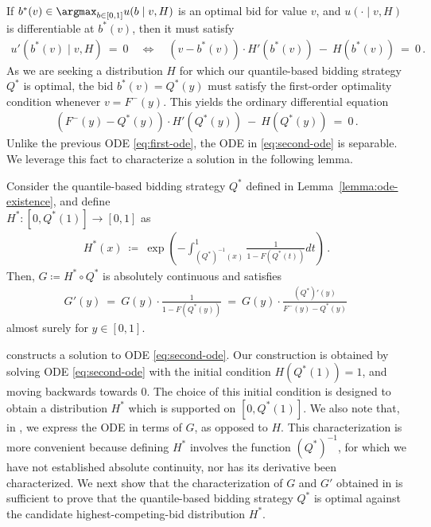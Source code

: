 If $b^*(v) \in \argmax_{b \in [0,1]} u(b \mid v,H)$ is an optimal bid for value $v$, and $u(\cdot \mid v,H)$ is differentiable at $b^*(v)$, then it must satisfy
\begin{align*}
	u'(b^*(v) \mid v,H)\ =\ 0 \quad \iff \quad (v- b^*(v)) \cdot H'(b^*(v))\ -\ H(b^*(v))\ =\ 0\,.
\end{align*}
As we are seeking a distribution $H$ for which our quantile-based bidding strategy $Q^*$ is optimal, the bid $b^*(v) = Q^*(y)$ must satisfy the first-order optimality condition whenever $v = F^-(y)$. This yields the ordinary differential equation
\begin{align}\label{eq:second-ode}
	(F^-(y) - Q^*(y)) \cdot H'(Q^*(y))\ -\ H(Q^*(y))\ =\ 0\,.
\end{align}
Unlike the previous ODE \eqref{eq:first-ode}, the ODE in \eqref{eq:second-ode} is separable. We leverage this fact to characterize a solution in the following lemma. 
\begin{lemma}\label{lemma:second-ode}
	Consider the quantile-based bidding strategy $Q^*$ defined in Lemma~\ref{lemma:ode-existence}, and define\\ $H^*:[0,Q^*(1)] \to [0,1]$ as
	\begin{align*}
		H^*(x)\ \coloneqq\ \exp\left( - \int_{(Q^*)^{-1}(x)}^1 \frac{1}{1 - F(Q^*(t))} dt \right)\,.
	\end{align*}
	Then, $G \coloneqq H^* \circ Q^*$ is absolutely continuous and satisfies
	\begin{align*}
		G'(y)\ =\ G(y) \cdot \frac{1}{1 - F(Q^*(y))}\ =\ G(y) \cdot \frac{(Q^*)'(y)}{F^-(y) - Q^*(y)}\,
	\end{align*}
	almost surely for $y \in [0,1]$.
\end{lemma}
 constructs a solution to ODE \eqref{eq:second-ode}. Our construction is obtained by solving ODE \eqref{eq:second-ode} with the initial condition $H(Q^*(1)) = 1$, and moving backwards towards $0$. The choice of this initial condition is designed to obtain a distribution $H^*$ which is supported on $[0,Q^*(1)]$. We also note that, in , we express the ODE in terms of $G$, as opposed to $H$. This characterization is more convenient because defining $H^*$ involves the function $(Q^*)^{-1}$, for which we have not established absolute continuity, nor has its derivative been characterized. 
We next show that the characterization of $G$ and $G'$ obtained in  is sufficient to prove that the quantile-based bidding strategy $Q^*$ is optimal against the candidate highest-competing-bid distribution $H^*$.

